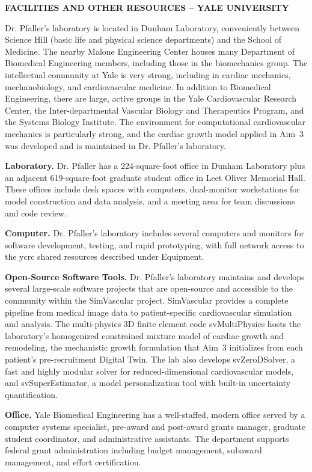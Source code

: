 \documentclass[11pt]{article}
\begin{document}
\clearpage
\textbf{\uppercase{Facilities and Other Resources -- Yale University}}

Dr. Pfaller's laboratory is located in Dunham Laboratory, conveniently between Science Hill (basic life and physical science departments) and the School of Medicine. The nearby Malone Engineering Center houses many Department of Biomedical Engineering members, including those in the biomechanics group. The intellectual community at Yale is very strong, including in cardiac mechanics, mechanobiology, and cardiovascular medicine. In addition to Biomedical Engineering, there are large, active groups in the Yale Cardiovascular Research Center, the Inter-departmental Vascular Biology and Therapeutics Program, and the Systems Biology Institute. The environment for computational cardiovascular mechanics is particularly strong, and the cardiac growth model applied in Aim~3 was developed and is maintained in Dr. Pfaller's laboratory.

\textbf{Laboratory.} Dr. Pfaller has a 224-square-foot office in Dunham Laboratory plus an adjacent 619-square-foot graduate student office in Leet Oliver Memorial Hall. These offices include desk spaces with computers, dual-monitor workstations for model construction and data analysis, and a meeting area for team discussions and code review.

\textbf{Computer.} Dr. Pfaller's laboratory includes several computers and monitors for software development, testing, and rapid prototyping, with full network access to the \gls*{ycrc} shared resources described under Equipment.

\textbf{Open-Source Software Tools.} Dr. Pfaller's laboratory maintains and develops several large-scale software projects that are open-source and accessible to the community within the SimVascular project. SimVascular provides a complete pipeline from medical image data to patient-specific cardiovascular simulation and analysis. The multi-physics 3D finite element code svMultiPhysics hosts the laboratory's homogenized constrained mixture model of cardiac growth and remodeling, the mechanistic growth formulation that Aim~3 initializes from each patient's pre-recruitment Digital Twin. The lab also develops svZeroDSolver, a fast and highly modular solver for reduced-dimensional cardiovascular models, and svSuperEstimator, a model personalization tool with built-in uncertainty quantification.

\textbf{Office.} Yale Biomedical Engineering has a well-staffed, modern office served by a computer systems specialist, pre-award and post-award grants manager, graduate student coordinator, and administrative assistants. The department supports federal grant administration including budget management, subaward management, and effort certification.
\end{document}
